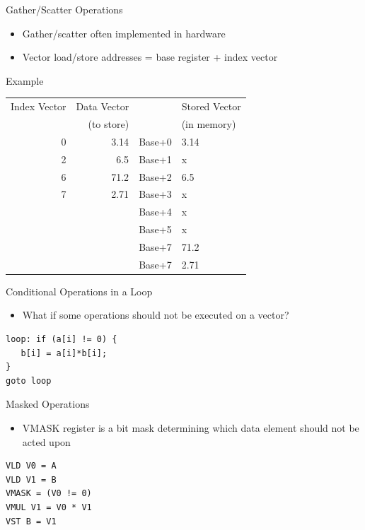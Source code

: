 \documentclass[presentation]{beamer}
\begin{document}
\begin{frame}[label={sec:org25cf5f7}]{Gather/Scatter Operations}
\begin{block}{}
\begin{itemize}
\item Gather/scatter often implemented in hardware
\end{itemize}

\begin{itemize}
\item Vector load/store addresses = base register + index vector
\end{itemize}
\end{block}

\begin{block}{Example}
\begin{center}
\begin{tabular}{rrll}
Index Vector & Data Vector &  & Stored Vector\\
 & (to store) &  & (in memory)\\
0 & 3.14 & Base+0 & 3.14\\
2 & 6.5 & Base+1 & x\\
6 & 71.2 & Base+2 & 6.5\\
7 & 2.71 & Base+3 & x\\
 &  & Base+4 & x\\
 &  & Base+5 & x\\
 &  & Base+7 & 71.2\\
 &  & Base+7 & 2.71\\
\end{tabular}
\end{center}
\end{block}
\end{frame}


\begin{frame}[label={sec:orgbd38df5},fragile]{Conditional Operations in a Loop}
 \begin{block}{}
\begin{itemize}
\item What if some operations should not be executed on a vector?
\end{itemize}

\lstset{language=C,label= ,caption= ,captionpos=b,numbers=none}
\begin{lstlisting}
loop: if (a[i] != 0) {
   b[i] = a[i]*b[i];
}
goto loop
\end{lstlisting}
\pause
\end{block}
\begin{block}{Masked Operations}
\begin{itemize}
\item VMASK register is a bit mask determining which data element should not be acted upon
\end{itemize}
\lstset{language=asm,label= ,caption= ,captionpos=b,numbers=none}
\begin{lstlisting}
VLD V0 = A
VLD V1 = B
VMASK = (V0 != 0)
VMUL V1 = V0 * V1
VST B = V1
\end{lstlisting}
\end{block}
\end{frame}
\end{document}
